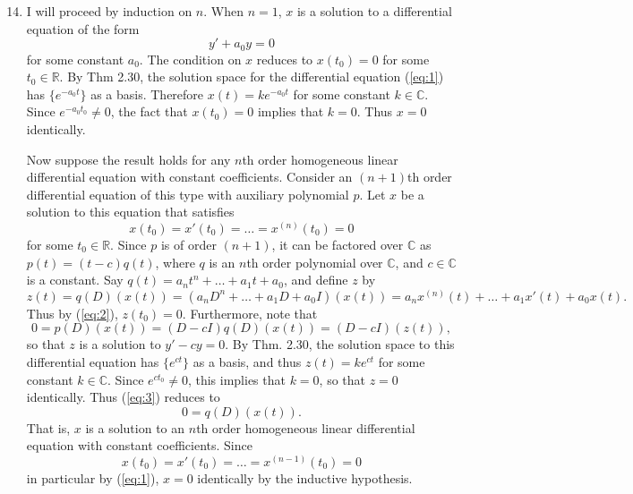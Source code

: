 \documentclass[12pt]{article}
\begin{document}
\begin{enumerate}
\setcounter{enumi}{13}
\item
I will proceed by induction on $n$. When $n=1$, $x$ is a solution to a differential equation of the form
\begin{equation} \label{eq:1}
y' + a_0y = 0
\end{equation}
for some constant $a_0$. The condition on $x$ reduces to $x(t_0) = 0$ for some $t_0 \in \mathbb{R}$. By Thm 2.30, the solution space for the differential equation (\ref{eq:1}) has $\{e^{-a_0 t}\}$ as a basis. Therefore $x(t) = k e^{-a_0 t}$ for some constant $k \in \mathbb{C}$. Since $e^{-a_0 t_0} \neq 0$, the fact that $x(t_0) = 0$ implies that $k = 0$. Thus $x = 0$ identically.

Now suppose the result holds for any $n$th order homogeneous linear differential equation with constant coefficients. Consider an $(n+1)$th order differential equation of this type with auxiliary polynomial $p$. Let $x$ be a solution to this equation that satisfies
\begin{equation} \label{eq:2}
x(t_0) = x'(t_0) = \dots = x^{(n)}(t_0) = 0
\end{equation}
for some $t_0 \in \mathbb{R}$. Since $p$ is of order $(n+1)$, it can be factored over $\mathbb{C}$ as $p(t) = (t-c)q(t)$, where $q$ is an $n$th order polynomial over $\mathbb{C}$, and $c \in \mathbb{C}$ is a constant. Say $q(t) = a_nt^n + \dots + a_1t + a_0$, and define $z$ by
\begin{equation} \label{eq:3}
z(t) = q(D)(x(t)) = (a_nD^n + \dots + a_1D + a_0I)(x(t)) = a_nx^{(n)}(t) + \dots + a_1x'(t) + a_0x(t).
\end{equation}
Thus by (\ref{eq:2}), $z(t_0) = 0$. Furthermore, note that
\begin{equation*}
0 = p(D)(x(t)) = (D-cI)q(D)(x(t)) = (D-cI)(z(t)),
\end{equation*}
so that $z$ is a solution to $y' - cy = 0$. By Thm. 2.30, the solution space to this differential equation has $\{e^{ct}\}$ as a basis, and thus $z(t) = ke^{ct}$ for some constant $k \in \mathbb{C}$. Since $e^{ct_0} \neq 0$, this implies that $k = 0$, so that $z = 0$ identically. Thus (\ref{eq:3}) reduces to
\begin{equation*}
0 = q(D)(x(t)).
\end{equation*}
That is, $x$ is a solution to an $n$th order homogeneous linear differential equation with constant coefficients. Since
\begin{equation*}
x(t_0) = x'(t_0) = \dots = x^{(n-1)}(t_0) = 0
\end{equation*}
in particular by (\ref{eq:1}), $x=0$ identically by the inductive hypothesis.

\end{enumerate}
\end{document}
